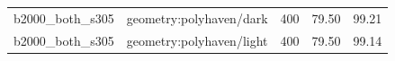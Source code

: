 \begin{longtable}{l>{\raggedright\arraybackslash}p{.42\linewidth}rrr}
b2000\_\allowbreak{}both\_\allowbreak{}s305 & %
geometry:polyhaven/dark & %
400 & %
79.50 & %
99.21 \\ %

b2000\_\allowbreak{}both\_\allowbreak{}s305 & %
geometry:polyhaven/light & %
400 & %
79.50 & %
99.14 \\ %


\end{longtable}
